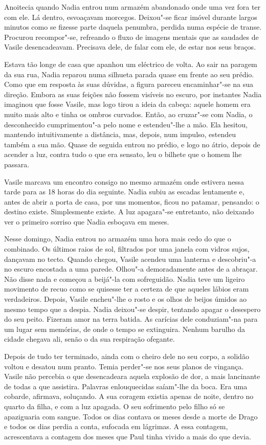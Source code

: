 Anoitecia quando Nadia entrou num armazém abandonado onde uma vez fora
ter com ele. Lá dentro, esvoaçavam morcegos. Deixou"-se ficar imóvel
durante largos minutos como se fizesse parte daquela penumbra, perdida
numa espécie de transe. Procurou recompor"-se, refreando o fluxo de
imagens mentais que as saudades de Vasile desencadeavam. Precisava dele,
de falar com ele, de estar nos seus braços.

Estava tão longe de casa que apanhou um eléctrico de volta. Ao sair na
paragem da sua rua, Nadia reparou numa silhueta parada quase em frente
ao seu prédio. Como que em resposta às suas dúvidas, a figura pareceu
encaminhar"-se na sua direção. Embora as suas feições não fossem
visíveis no escuro, por instantes Nadia imaginou que fosse Vasile, mas
logo tirou a ideia da cabeça: aquele homem era muito mais alto e tinha
os ombros curvados. Então, ao cruzar"-se com Nadia, o desconhecido
cumprimentou"-a pelo nome e estendeu"-lhe a mão. Ela hesitou, mantendo
intuitivamente a distância, mas, depois, num impulso, estendeu também a
sua mão. Quase de seguida entrou no prédio, e logo no átrio, depois de
acender a luz, contra tudo o que era sensato, leu o bilhete que o
homem lhe passara.

Vasile marcava um encontro consigo no mesmo armazém onde estivera nessa tarde para as 18 horas do dia seguinte. Nadia
subiu as escadas lentamente e, antes de abrir a porta de casa, por uns
momentos, ficou no patamar, pensando: o destino existe. Simplesmente
existe. A luz apagara"-se entretanto, não deixando ver o primeiro sorriso
que Nadia esboçava em meses.

Nesse domingo, Nadia entrou no armazém uma hora mais cedo do que o
combinado. Os últimos raios de sol, filtrados por uma janela com vidros
sujos, dançavam no tecto. Quando chegou, Vasile acendeu uma lanterna e
descobriu"-a no escuro encostada a uma parede. Olhou"-a demoradamente
antes de a abraçar. Não disse nada e começou a beijá"-la com sofreguidão.
Nadia teve um ligeiro movimento de recuo como se quisesse ter a certeza
de que aqueles lábios eram verdadeiros. Depois, Vasile encheu"-lhe o
rosto e os olhos de beijos úmidos ao mesmo tempo que a despia. Nadia
deixou"-se despir, tentando apagar o desespero do seu peito. Fizeram
amor na terra batida. As carícias dele conduziam"-na para um lugar sem
memórias, de onde o tempo se extinguira. Nenhum barulho da cidade
chegava ali, senão o da sua respiração ofegante.

Depois de tudo ter terminado, ainda com o cheiro dele
no seu corpo, a solidão voltou e desatou num pranto. Temia perder"-se nos
seus planos de vingança. Vasile não percebia o que desencadeara aquela
explosão de dor, a mais lancinante de todas a que assistira. Palavras
enlouquecidas saíam"-lhe da boca. Era uma cobarde, afirmava, soluçando.
A sua coragem existia apenas de noite, dentro no quarto da filha, e com
a luz apagada. O seu sofrimento pelo filho só se apaziguaria com sangue.
Todos os dias contava os meses desde a morte de Drago e todos os dias
perdia a conta, sufocada em lágrimas. A essa contagem, acrescentava a
contagem dos meses que Paul tinha vivido a mais do que devia.

